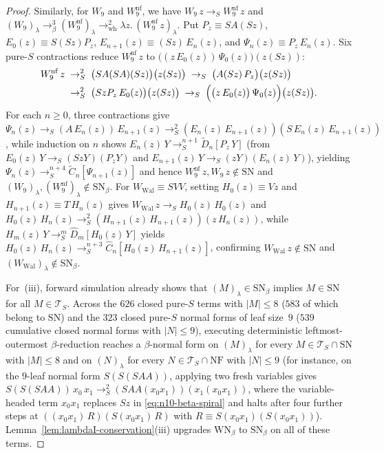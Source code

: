 \documentclass[11pt,reqno]{amsart}
\numberwithin{equation}{section}
\theoremstyle{plain}
\theoremstyle{definition}
\theoremstyle{remark}
\newcommand{\TS}{\mathcal{T}_S}
\newcommand{\NF}{\mathrm{NF}}
\newcommand{\SN}{\mathrm{SN}}
\newcommand{\WN}{\mathrm{WN}}
\newcommand{\redS}{\to_S}
\begin{document}
\begin{proof}
Similarly, for $W_9$ and $W_9^{\mathrm{nf}}$, we have $W_9\,z \redS W_9^{\mathrm{nf}}\,z$ and $(W_9)_\lambda \to_\beta^3 (W_9^{\mathrm{nf}})_\lambda \to_{\mathrm{wh}}^2 \lambda z.\, (W_9^{\mathrm{nf}}\,z)_\lambda$. Put $P_z \equiv S A (S z)$, $E_0(z) \equiv S(S z)P_z$, $E_{n+1}(z) \equiv (S z)\,E_n(z)$, and $\Psi_n(z) \equiv P_z\,E_n(z)$. Six pure-$S$ contractions reduce $W_9^{\mathrm{nf}}\,z$ to $\bigl((z\,E_0(z))\,\Psi_0(z)\bigr)(z(S z))$:
\begin{equation}\label{eq:w9-beta-spiral}
\begin{aligned}
  W_9^{\mathrm{nf}}\,z
  &\;\redS^2\; \bigl(S A (S A)(S z)\bigr)\bigl(z(S z)\bigr) \;\redS\; \bigl(A(S z)\,P_z\bigr)\bigl(z(S z)\bigr) \\
  &\;\redS^2\; \bigl(S z P_z\,E_0(z)\bigr)\bigl(z(S z)\bigr) \;\redS\; \Bigl(\bigl(z\,E_0(z)\bigr)\,\Psi_0(z)\Bigr)\bigl(z(S z)\bigr).
\end{aligned}
\end{equation}
For each $n \ge 0$, three contractions give $\Psi_n(z) \redS (A\,E_n(z))\,E_{n+1}(z) \redS^2 (E_n(z)\,E_{n+1}(z))(S\,E_n(z)\,E_{n+1}(z))$, while induction on $n$ shows $E_n(z)\,Y \redS^{n+1} \widetilde{D}_n[P_z\,Y]$ (from $E_0(z)\,Y \redS (S z Y)(P_z Y)$ and $E_{n+1}(z)\,Y \redS (z Y)(E_n(z)\,Y)$), yielding $\Psi_n(z) \redS^{n+4} \widetilde{C}_n[\Psi_{n+1}(z)]$ and hence $W_9^{\mathrm{nf}}\,z, W_9\,z \notin \SN$ and $(W_9)_\lambda, (W_9^{\mathrm{nf}})_\lambda \notin \SN_\beta$. For $W_{\mathrm{Wal}} \equiv S V V$, setting $H_0(z) \equiv V z$ and $H_{n+1}(z) \equiv T\,H_n(z)$ gives $W_{\mathrm{Wal}}\,z \redS H_0(z)\,H_0(z)$ and $H_0(z)\,H_n(z) \redS^2 (H_{n+1}(z)\,H_{n+1}(z))(z\,H_n(z))$, while $H_m(z)\,Y \redS^m \widehat{D}_m[H_0(z)\,Y]$ yields $H_0(z)\,H_n(z) \redS^{n+3} \widehat{C}_n[H_0(z)\,H_{n+1}(z)]$, confirming $W_{\mathrm{Wal}}\,z \notin \SN$ and $(W_{\mathrm{Wal}})_\lambda \notin \SN_\beta$.

For~(iii), forward simulation already shows that $(M)_\lambda \in \SN_\beta$ implies $M \in \SN$ for all $M \in \TS$. Across the $626$ closed pure-$S$ terms with $|M| \le 8$ ($583$ of which belong to $\SN$) and the $323$ closed pure-$S$ normal forms of leaf size~$9$ ($539$ cumulative closed normal forms with $|N| \le 9$), executing deterministic leftmost-outermost $\beta$-reduction reaches a $\beta$-normal form on $(M)_\lambda$ for every $M \in \TS \cap \SN$ with $|M| \le 8$ and on $(N)_\lambda$ for every $N \in \TS \cap \NF$ with $|N| \le 9$ (for instance, on the $9$-leaf normal form $S(S(S A A))$, applying two fresh variables gives $S(S(S A A))\,x_0\,x_1 \redS^2 (S A A (x_0 x_1))(x_1(x_0 x_1))$, where the variable-headed term $x_0 x_1$ replaces $S z$ in \eqref{eq:n10-beta-spiral} and halts after four further steps at $((x_0 x_1)\,R)(S(x_0 x_1)\,R)$ with $R \equiv S(x_0 x_1)(S(x_0 x_1))$). Lemma~\ref{lem:lambdaI-conservation}(iii) upgrades $\WN_\beta$ to $\SN_\beta$ on all of these terms.
\end{proof}
\end{document}
